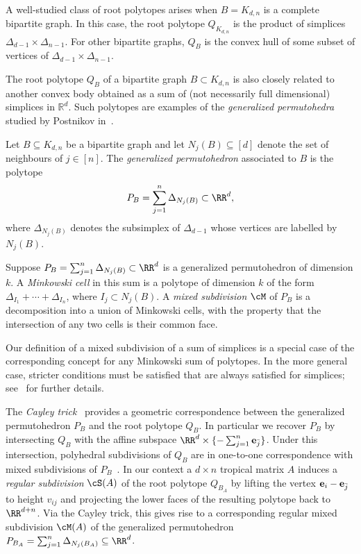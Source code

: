 \begin{example}
A well-studied class of root polytopes arises when $B=K_{d,n}$ is a complete bipartite graph. In this case, the root polytope $Q_{K_{d,n}}$ is the product of simplices $\Delta_{d-1}\times \Delta_{n-1}$. For other bipartite graphs, $Q_B$ is the convex hull of some subset of vertices of $\Delta_{d-1}\times\Delta_{n-1}$.
\end{example}

The root polytope $Q_B$ of a bipartite graph $B \subset K_{d,n}$ is also closely related to another convex body obtained as a sum of (not necessarily full dimensional) simplices in ${\mathbb R}^d$.  Such polytopes are examples of the \emph{generalized permutohedra} studied by Postnikov in~\cite{postnikov2009permutohedra}.

\begin{definition}\label{def: generalizedPermutohedron} Let $B\subseteq K_{d,n}$ be a bipartite graph and let $N_j(B)\subseteq [d]$ denote the set of neighbours of $j \in [n]$.
The \emph{generalized permutohedron} associated to $B$ is the polytope
$$
P_B = \sum_{j = 1}^n \Delta_{N_j(B)} \subset \RR^{d},
$$
where $\Delta_{N_j(B)}$ denotes the subsimplex of $\Delta_{d-1}$ whose vertices are labelled by $N_j(B)$.
\end{definition}

\begin{definition}
Suppose $P_B = \sum_{j = 1}^n \Delta_{N_j(B)} \subset \RR^{d}$ is a generalized permutohedron of dimension $k$.
A \emph{Minkowski cell} in this sum is a polytope of dimension $k$ of the form $\Delta_{I_1} + \cdots + \Delta_{I_n}$, where $I_j \subset N_j(B)$.
A \emph{mixed subdivision} $\cM$ of $P_B$ is a decomposition into a union of Minkowski cells, with the property that the intersection of any two cells is their common face.
\end{definition}

\begin{remark}
Our definition of a mixed subdivision of a sum of simplices is a special case of the corresponding concept for any Minkowski sum of polytopes. In the more general case, stricter conditions must be satisfied that are always satisfied for simplices; see~\cite{San02} for further details.
\end{remark}

The \emph{Cayley trick}~\cite{santos2005cayley} provides a geometric correspondence between the generalized permutohedron $P_B$ and the root polytope $Q_B$.  In particular we recover $P_B$ by intersecting $Q_B$ with the affine subspace $\RR^d \times \{-\sum_{j=1}^n {\bf e}_{\bar{j}}\}$.
Under this intersection, polyhedral subdivisions of $Q_B$ are in one-to-one correspondence with mixed subdivisions of $P_B$~\cite{huber2000cayley}.
In our context a $d \times n$ tropical matrix $A$ induces a \emph{regular subdivision} $\cS(A)$ of the root polytope $Q_{B_A}$ by lifting the vertex ${\bf e}_i-{\bf e}_{\bar{j}}$ to height $v_{ij}$ and projecting the lower faces of the resulting polytope back to $\RR^{d+n}$. Via the Cayley trick, this gives rise to a corresponding regular mixed subdivision $\cM(A)$ of the generalized permutohedron $P_{B_A}= \sum_{j=1}^n \Delta_{N_j(B_A)}\subseteq \RR^d$.

